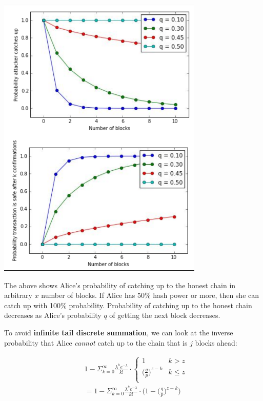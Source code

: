 \documentclass[full.tex]{subfiles}
\begin{document}
      \includegraphics[scale=1]{doublespend_plots}
      \medskip
   
    The above shows Alice's probability of catching up to the honest chain in arbitrary $x$ number of blocks. If Alice has 50\% hash power or more, then she can catch up with 100\% probability. Probability of catching up to the honest chain decreases as Alice's probability $q$ of getting the next block decreases.
    
    To avoid \textbf{infinite tail discrete summation}, we can look at the inverse probability that Alice \textit{cannot} catch up to the chain that is $j$ blocks ahead:
    
    \begin{equation*}
        \begin{split}
           & 1 - \Sigma_{k=0}^\infty \frac{\lambda^k e^{-\lambda}}{k!} \cdot  \left\{
    \begin{array}{ll}
      1  & k > z \\ 
      \big(\frac{q}{p}\big)^{z-k} & k \leq z \\
    \end{array}
  \right. \\
  &= 1 -\Sigma_{k=0}^\infty \frac{\lambda^k e^{-\lambda}}{k!} \cdot \Bigg(1- \big(\frac{q}{p}\big)^{z-k}\Bigg)
        \end{split}
    \end{equation*}
    
\end{document}
